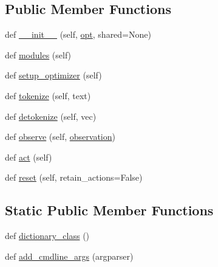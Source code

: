 \subsection*{Public Member Functions}
\begin{DoxyCompactItemize}
\item 
def \hyperlink{classtaskntalk_1_1coopgame__agent_1_1CooperativeGameAgent_a99e865ac4567a7ba60a63fcf81f987a6}{\+\_\+\+\_\+init\+\_\+\+\_\+} (self, \hyperlink{classparlai_1_1core_1_1agents_1_1Agent_ab3b45d2754244608c75d4068b90cd051}{opt}, shared=None)
\item 
def \hyperlink{classtaskntalk_1_1coopgame__agent_1_1CooperativeGameAgent_a648878b4ec58602fb0b8d13cd119ded3}{modules} (self)
\item 
def \hyperlink{classtaskntalk_1_1coopgame__agent_1_1CooperativeGameAgent_ad4a768b95069e59032643450d45e6cb6}{setup\+\_\+optimizer} (self)
\item 
def \hyperlink{classtaskntalk_1_1coopgame__agent_1_1CooperativeGameAgent_a78fcf261c9be67a548a59946d3f48757}{tokenize} (self, text)
\item 
def \hyperlink{classtaskntalk_1_1coopgame__agent_1_1CooperativeGameAgent_a99991815267970d608d6f585c9cac649}{detokenize} (self, vec)
\item 
def \hyperlink{classtaskntalk_1_1coopgame__agent_1_1CooperativeGameAgent_aa3bad16932f23c0f55370d01000474ee}{observe} (self, \hyperlink{classtaskntalk_1_1coopgame__agent_1_1CooperativeGameAgent_a8e06cf94d70b9539ef2ebc267c2cd2b6}{observation})
\item 
def \hyperlink{classtaskntalk_1_1coopgame__agent_1_1CooperativeGameAgent_a55ee36e8823dccdcd456bdbf409bccd5}{act} (self)
\item 
def \hyperlink{classtaskntalk_1_1coopgame__agent_1_1CooperativeGameAgent_a0133b3dda42271d18312205f4035bc59}{reset} (self, retain\+\_\+actions=False)
\end{DoxyCompactItemize}
\subsection*{Static Public Member Functions}
\begin{DoxyCompactItemize}
\item 
def \hyperlink{classtaskntalk_1_1coopgame__agent_1_1CooperativeGameAgent_ab2db3d82d26737957552affd288eb36f}{dictionary\+\_\+class} ()
\item 
def \hyperlink{classtaskntalk_1_1coopgame__agent_1_1CooperativeGameAgent_a12c44e2508ef71d25a937cb4de5c77ca}{add\+\_\+cmdline\+\_\+args} (argparser)
\end{DoxyCompactItemize}
